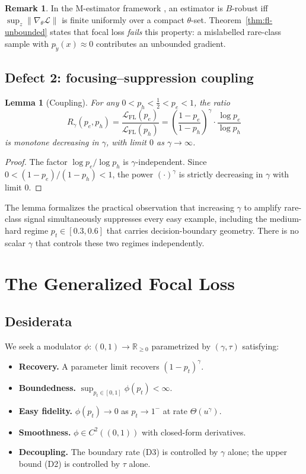 \documentclass[conference]{IEEEtran}
\newtheorem{lemma}[theorem]{Lemma}
\theoremstyle{definition}
\newtheorem{remark}[theorem]{Remark}
\newcommand{\R}{\mathbb{R}}
\newcommand{\LFL}{\mathcal{L}_{\mathrm{FL}}}
\begin{document}
\begin{remark}
In the M-estimator framework \cite{huber1981}, an estimator is $B$-robust iff $\sup_z \|\nabla_\theta \mathcal{L}\|$ is finite uniformly over a compact $\theta$-set. Theorem~\ref{thm:fl-unbounded} states that focal loss \emph{fails} this property: a mislabelled rare-class sample with $p_{\tilde y}(x) \approx 0$ contributes an unbounded gradient.
\end{remark}

\subsection{Defect 2: focusing--suppression coupling}
\begin{lemma}[Coupling]\label{lem:fl-coupling}
For any $0 < p_h < \tfrac{1}{2} < p_e < 1$, the ratio
\[
R_\gamma(p_e, p_h) = \frac{\LFL(p_e)}{\LFL(p_h)} = \left(\frac{1-p_e}{1-p_h}\right)^\gamma \cdot \frac{\log p_e}{\log p_h}
\]
is monotone decreasing in $\gamma$, with limit $0$ as $\gamma \to \infty$.
\end{lemma}
\begin{proof}
The factor $\log p_e / \log p_h$ is $\gamma$-independent. Since $0 < (1-p_e)/(1-p_h) < 1$, the power $(\cdot)^\gamma$ is strictly decreasing in $\gamma$ with limit $0$.
\end{proof}

The lemma formalizes the practical observation that increasing $\gamma$ to amplify rare-class signal simultaneously suppresses every easy example, including the medium-hard regime $p_t \in [0.3, 0.6]$ that carries decision-boundary geometry. There is no scalar $\gamma$ that controls these two regimes independently.

\section{The Generalized Focal Loss}
\label{sec:construction}

\subsection{Desiderata}
We seek a modulator $\phi : (0,1) \to \R_{\ge 0}$ parametrized by $(\gamma, \tau)$ satisfying:
\begin{itemize}[leftmargin=1.6em]
\item[(D1)] \textbf{Recovery.} A parameter limit recovers $(1-p_t)^\gamma$.
\item[(D2)] \textbf{Boundedness.} $\sup_{p_t \in [0,1]} \phi(p_t) < \infty$.
\item[(D3)] \textbf{Easy fidelity.} $\phi(p_t) \to 0$ as $p_t \to 1^-$ at rate $\Theta(u^\gamma)$.
\item[(D4)] \textbf{Smoothness.} $\phi \in C^2((0,1))$ with closed-form derivatives.
\item[(D5)] \textbf{Decoupling.} The boundary rate (D3) is controlled by $\gamma$ alone; the upper bound (D2) is controlled by $\tau$ alone.
\end{itemize}
\end{document}
